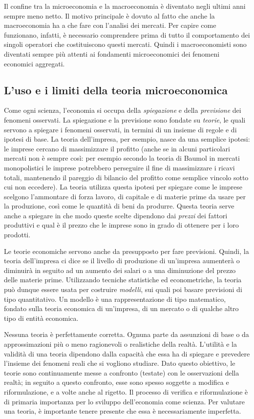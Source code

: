 Il confine tra la microeconomia e la macroeconomia è diventato negli ultimi 
anni sempre meno netto. Il motivo principale è dovuto al fatto che anche la 
macroeconomia ha a che fare con l'analisi dei mercati. Per capire come 
funzionano, infatti, è necessario comprendere prima di tutto il comportamento 
dei singoli operatori che costituiscono questi mercati. Quindi i 
macroeconomisti sono diventati sempre più attenti ai 
fondamenti microeconomici dei fenomeni economici aggregati.

\subsection{L'uso e i limiti della teoria microeconomica}

Come ogni scienza, l'economia si occupa della \emph{spiegazione} e della 
\emph{previsione} dei fenomeni osservati. La spiegazione e la previsione sono 
fondate su \emph{teorie}, le quali servono a spiegare i fenomeni osservati, in 
termini di un insieme di regole e di ipotesi di base. 
La teoria 
dell'impresa, per esempio, nasce da una semplice ipotesi: le imprese cercano 
di massimizzare il profitto (anche se in alcuni particolari mercati non è 
sempre così: per esempio secondo la teoria di Baumol in mercati monopolistici 
le imprese potrebbero perseguire il fine di massimizzare i ricavi totali, 
mantenendo il pareggio di bilancio del profitto come semplice vincolo sotto cui 
non eccedere). La teoria utilizza questa ipotesi per spiegare come le imprese 
scelgono l'ammontare di forza lavoro, di capitale e di materie prime da usare 
per la produzione, così come le quantità di beni da produrre. Questa teoria 
serve anche a spiegare in che modo queste scelte dipendono dai \emph{prezzi} 
dei fattori produttivi e qual è il prezzo che le imprese sono in grado di 
ottenere per i loro prodotti.

Le teorie economiche servono anche da presupposto per fare previsioni. Quindi, 
la teoria dell'impresa ci dice se il livello di produzione di un'impresa 
aumenterà o diminuirà in seguito ad un aumento dei salari o a una diminuzione 
del prezzo delle materie prime. Utilizzando tecniche statistiche ed 
econometriche, la teoria può dunque essere usata per costruire \emph{modelli}, 
sui quali poi basare previsioni di tipo quantitativo. Un modello è una 
rappresentazione di tipo matematico, fondato sulla teoria economica di 
un'impresa, di un mercato o di qualche altro tipo di entità economica.

Nessuna teoria è perfettamente corretta. Ognuna parte da assunzioni di base o 
da approssimazioni più o meno ragionevoli o realistiche della realtà. L'utilità 
e la validità di una teoria dipendono dalla capacità che essa ha di spiegare e 
prevedere l'insieme dei fenomeni reali che si vogliono studiare. Dato questo 
obiettivo, le teorie sono continuamente messe a confronto (testate) con le 
osservazioni della realtà; in seguito a questo confronto, esse sono spesso 
soggette a modifica e riformulazione, e a volte anche al rigetto. Il processo 
di verifica e riformulazione è di primaria importanza per lo sviluppo 
dell'economia come scienza. Per valutare una teoria, è importante tenere 
presente che essa è necessariamente imperfetta.

